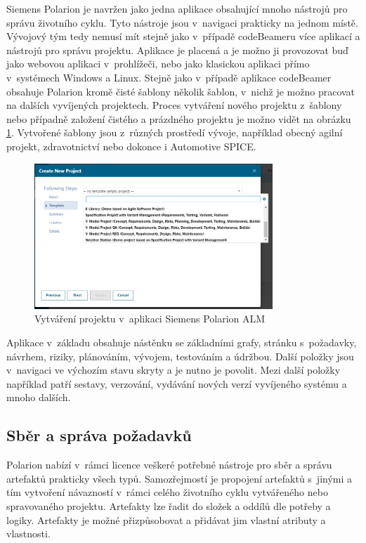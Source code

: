 \documentclass[czech,master]{diploma}
\begin{document}
Siemens Polarion je navržen jako jedna aplikace obsahující mnoho nástrojů pro správu životního cyklu. Tyto nástroje jsou v~navigaci prakticky na jednom místě. Vývojový tým tedy nemusí mít stejně jako v~případě codeBeameru více aplikací a nástrojů pro správu projektu. Aplikace je placená a je možno ji provozovat buď jako webovou aplikaci v~prohlížeči, nebo jako klasickou aplikaci přímo v~systémech Windows a Linux. Stejně jako v~případě aplikace codeBeamer obsahuje Polarion kromě čisté šablony několik šablon, v~nichž je možno pracovat na dalších vyvíjených projektech. Proces vytváření nového projektu z~šablony nebo případně založení čistého a prázdného projektu je možno vidět na obrázku \ref{fig:polarion_new_project}. Vytvořené šablony jsou z~různých prostředí vývoje, například obecný agilní projekt, zdravotnictví nebo dokonce i Automotive SPICE.


\begin{figure}[!ht]
    \centering
    \includegraphics[width=0.8\textwidth]{Diplomka/Figures/polarion_create_project.png}
    \caption{Vytváření projektu v~aplikaci Siemens Polarion ALM}
    \label{fig:polarion_new_project}
\end{figure}


Aplikace v~základu obsahuje nástěnku se základními grafy, stránku s~požadavky, návrhem, riziky, plánováním, vývojem, testováním a údržbou. Další položky jsou v~navigaci ve výchozím stavu skryty a je nutno je povolit. Mezi další položky například patří sestavy, verzování, vydávání nových verzí vyvíjeného systému a mnoho dalších.

\subsection{Sběr a správa požadavků}
Polarion nabízí v~rámci licence veškeré potřebné nástroje pro sběr a správu artefaktů prakticky všech typů. Samozřejmostí je propojení artefaktů s~jinými a tím vytvoření návazností v~rámci celého životního cyklu vytvářeného nebo spravovaného projektu. Artefakty lze řadit do složek a oddílů dle potřeby a logiky. Artefakty je možné přizpůsobovat a přidávat jim vlastní atributy a vlastnosti.
\end{document}
